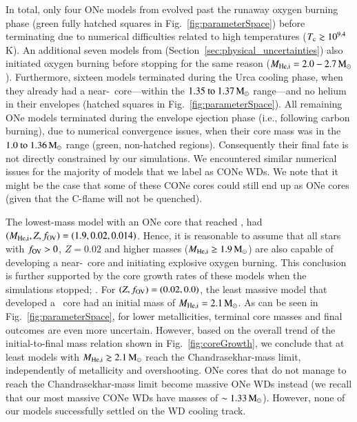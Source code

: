 \documentclass[main.tex]{subfiles}
\begin{document}
In total, only four ONe models from \seriesone evolved past the runaway oxygen burning phase  
(green fully hatched squares in Fig.~\ref{fig:parameterSpace}) before terminating due to 
numerical difficulties related to  high  temperatures ($T_{\rm c}\gtrsim 10^{9.4}$\,K).  
An additional seven models from \seriestwo (Section~\ref{sec:physical_uncertainties}) 
also initiated oxygen burning before stopping for the same reason ($M_{\rm He, i}=2.0-2.7\mathrm{\,M_\odot}$). 
Furthermore, sixteen models terminated during the Urca cooling phase, 
when they already had a near-\mch\ core---within the $\numrange{1.35}{1.37}\msun$ range---and no helium in their envelopes (hatched squares in Fig.~\ref{fig:parameterSpace}).
All remaining \seriesone ONe models terminated during the envelope ejection phase (i.e., following carbon burning), due to numerical convergence issues, when their core mass was in 
the $\numrange{1.0}{1.36}\msun$ range (green, non-hatched regions). Consequently their final fate is not directly constrained by our simulations. We encountered similar numerical issues for the majority of models that we label as CONe WDs. We note that it might be the case that some of these CONe cores could still end up as ONe cores (given that the C-flame will not be quenched).

The lowest-mass model with an ONe core that reached \mch,  had   
$(M_{\rm He, i},Z,f_{\rm OV})=(1.9,0.02,0.014)$. Hence, it is 
reasonable to assume that all stars with $f_{\rm OV}>0$, $Z=0.02$ and  higher masses ($M_{\rm He, i}\geq 1.9\mathrm{\,M_\odot}$)  
are also capable of developing a near-\mch\ core and initiating explosive oxygen burning.
This conclusion is further supported by the core growth rates of these models when the simulations stopped; \citep[$\mdot \simeq 10^{-5}\mdotsun$; see also][]{Poelarends:2017dua}. 
For $(Z,f_{\rm OV}) = (0.02,0.0)$, the least massive model that developed a \mch\ core had an initial mass of  $M_{\rm He,i}=2.1\mathrm{\,M_\odot}$. 
As can be seen in Fig.~\ref{fig:parameterSpace}, for lower metallicities, terminal core masses and final outcomes are even more uncertain. 
However, based on the overall trend of the initial-to-final mass relation shown in Fig.~\ref{fig:coreGrowth}, we conclude that at least  models with  $M_{\rm He, i}\gtrsim 2.1\mathrm{\,M_\odot}$ reach the Chandrasekhar-mass limit,  independently of metallicity and overshooting.
ONe cores that  do not manage to reach the Chandrasekhar-mass limit  become massive ONe WDs instead (we recall that our most massive CONe WDs have masses of $\sim 1.33\mathrm{\,M_\odot}$). However, none of our models successfully settled on the WD cooling track. 
\end{document}

